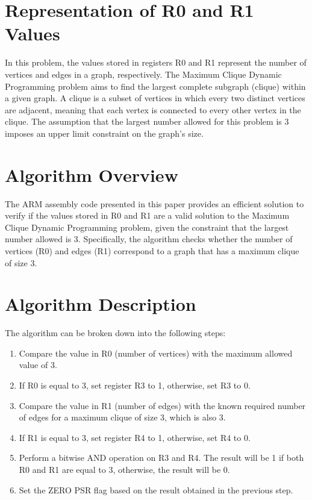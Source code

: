 
%
%


\section{Representation of R0 and R1 Values}

In this problem, the values stored in registers R0 and R1 represent the number of vertices and edges in a graph, respectively. The Maximum Clique Dynamic Programming problem aims to find the largest complete subgraph (clique) within a given graph. A clique is a subset of vertices in which every two distinct vertices are adjacent, meaning that each vertex is connected to every other vertex in the clique. The assumption that the largest number allowed for this problem is 3 imposes an upper limit constraint on the graph's size.

\section{Algorithm Overview}

The ARM assembly code presented in this paper provides an efficient solution to verify if the values stored in R0 and R1 are a valid solution to the Maximum Clique Dynamic Programming problem, given the constraint that the largest number allowed is 3. Specifically, the algorithm checks whether the number of vertices (R0) and edges (R1) correspond to a graph that has a maximum clique of size 3.

\section{Algorithm Description}

The algorithm can be broken down into the following steps:

\begin{enumerate}
\item Compare the value in R0 (number of vertices) with the maximum allowed value of 3.
\item If R0 is equal to 3, set register R3 to 1, otherwise, set R3 to 0.
\item Compare the value in R1 (number of edges) with the known required number of edges for a maximum clique of size 3, which is also 3.
\item If R1 is equal to 3, set register R4 to 1, otherwise, set R4 to 0.
\item Perform a bitwise AND operation on R3 and R4. The result will be 1 if both R0 and R1 are equal to 3, otherwise, the result will be 0.
\item Set the ZERO PSR flag based on the result obtained in the previous step.
\end{enumerate}

